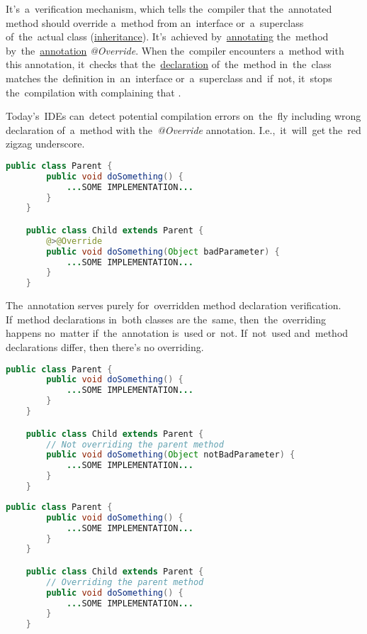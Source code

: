 \label{javaoverride}
It's~a~verification mechanism, which tells the~compiler that the~annotated method should override a~method from an~interface or~a~superclass of~the~actual class (\hyperref[inheritance]{inheritance}).
It's~achieved by~\hyperref[javaannotation]{annotating} the~method by~the~\hyperref[javaannotation]{annotation} \textit{@Override}.
When the~compiler encounters a~method with this annotation, it~checks that the~\hyperref[declarationdefinition]{declaration} of~the~method in~the~class matches the~definition in~an~interface or~a~superclass and~if~not, it~stops the~compilation with complaining that .

\note Today's~IDEs can~detect potential compilation errors on~the~fly including wrong declaration of~a~method with the~\textit{@Override} annotation.
I.e.,~it~will~get the~red zigzag underscore.

\begin{lstlisting}[language=Java]
    public class Parent {
        public void doSomething() {
            ...SOME IMPLEMENTATION...
        }
    }

    public class Child extends Parent {
        @>@Override
        public void doSomething(Object badParameter) {
            ...SOME IMPLEMENTATION...
        }
    }
\end{lstlisting}

\warning The~annotation serves purely for~overridden method declaration verification.
If~method declarations in~both classes are the~same, then~the~overriding happens no~matter if~the~annotation is~used or~not.
If~not~used and~method declarations differ, then there's no overriding.

\begin{lstlisting}[language=Java]
    public class Parent {
        public void doSomething() {
            ...SOME IMPLEMENTATION...
        }
    }

    public class Child extends Parent {
        // Not overriding the parent method
        public void doSomething(Object notBadParameter) {
            ...SOME IMPLEMENTATION...
        }
    }
\end{lstlisting}

\begin{lstlisting}[language=Java]
    public class Parent {
        public void doSomething() {
            ...SOME IMPLEMENTATION...
        }
    }

    public class Child extends Parent {
        // Overriding the parent method
        public void doSomething() {
            ...SOME IMPLEMENTATION...
        }
    }
\end{lstlisting}

